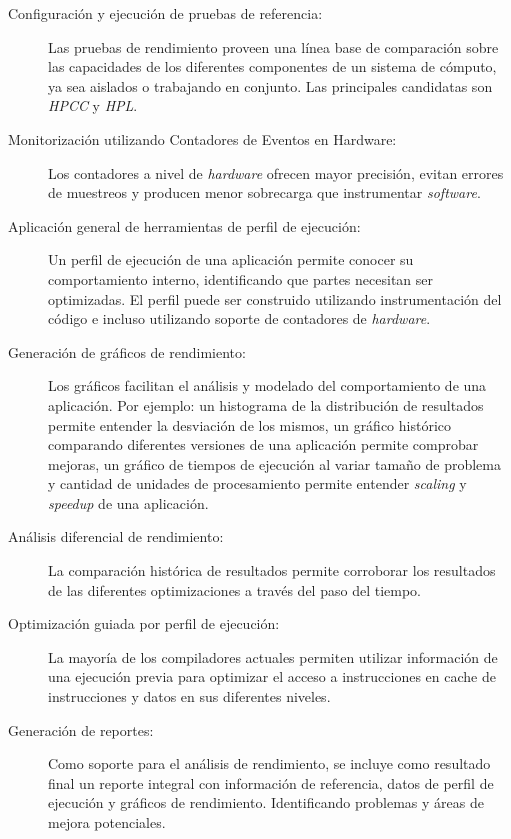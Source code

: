 \documentclass[a4paper]{article}
\begin{document}
\begin{description}
\item[Configuración y ejecución de pruebas de referencia:]

Las pruebas de rendimiento proveen una línea base de comparación sobre las capacidades de los diferentes componentes de un sistema de cómputo, ya sea aislados o trabajando en conjunto. Las principales candidatas son {\it HPCC} y {\it HPL}.

\item[Monitorización utilizando Contadores de Eventos en Hardware:]

Los contadores a nivel de {\it hardware} ofrecen mayor precisión, evitan errores de muestreos y producen menor sobrecarga que instrumentar {\it software}.

\item[Aplicación general de herramientas de perfil de ejecución:]

Un perfil de ejecución de una aplicación permite conocer su comportamiento interno, identificando que partes necesitan ser optimizadas. El perfil puede ser construido utilizando instrumentación del código e incluso utilizando soporte de contadores de {\it hardware}.

\item[Generación de gráficos de rendimiento:]

Los gráficos facilitan el análisis y modelado del comportamiento de una aplicación. Por ejemplo: un histograma de la distribución de resultados permite entender la desviación de los mismos, un gráfico histórico comparando diferentes versiones de una aplicación permite comprobar mejoras, un gráfico de tiempos de ejecución al variar tamaño de problema y cantidad de unidades de procesamiento permite entender {\it scaling} y {\it speedup} de una aplicación.

\item[Análisis diferencial de rendimiento:]

La comparación histórica de resultados permite corroborar los resultados de las diferentes optimizaciones a través del paso del tiempo.

\item[Optimización guiada por perfil de ejecución:]

La mayoría de los compiladores actuales permiten utilizar información de una ejecución previa para optimizar el acceso a instrucciones en cache de instrucciones y datos en sus diferentes niveles.

\item[Generación de reportes:]

Como soporte para el análisis de rendimiento, se incluye como resultado final un reporte integral con información de referencia, datos de perfil de ejecución y gráficos de rendimiento. Identificando problemas y áreas de mejora potenciales.

\end{description}
\end{document}
